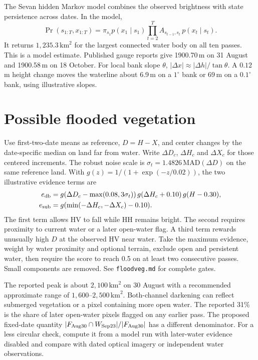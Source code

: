 \documentclass[11pt]{article}
\begin{document}
The Sevan hidden Markov model combines the observed brightness with
state persistence across dates. In the model,
\[
 \Pr(s_{1:T},x_{1:T})=\pi_{s_1}p(x_1\mid s_1)
 \prod_{t=2}^{T}A_{s_{t-1},s_t}\,p(x_t\mid s_t).
\]
It returns $1{,}235.3\,\mathrm{km}^2$ for the largest connected water
body on all ten passes. This is a model estimate. Published gauge
reports give 1900.70\,m on 31 August and 1900.58\,m on 18 October.
For local bank slope $\theta$, $|\Delta x|\approx|\Delta h|/\tan\theta$.
A $0.12$\,m height change moves the waterline about 6.9\,m on a
$1^\circ$ bank or 69\,m on a $0.1^\circ$ bank, using illustrative slopes.

\section{Possible flooded vegetation}
Use first-two-date means as reference, $D=H-X$, and center changes
by the date-specific median on land far from water. Write $\Delta D_c$,
$\Delta H_c$ and $\Delta X_c$ for those centered increments. The
robust noise scale is $\sigma_t=1.4826\,\mathrm{MAD}(\Delta D)$ on
the same reference land. With $g(z)=1/(1+\exp(-z/0.02))$, the two
illustrative evidence terms are
\begin{align*}
 e_{\rm db} &= g(\Delta D_c-\max(0.08,3\sigma_t))\,
              g(\Delta H_c+0.10)\,g(H-0.30),\\
 e_{\rm sub} &= g(\min(-\Delta H_c,-\Delta X_c)-0.10).
\end{align*}
The first term allows HV to fall while HH remains bright. The second
requires proximity to current water or a later open-water flag.
A third term rewards unusually high $D$ at the observed HV near water.
Take the maximum evidence, weight by water proximity and optional
terrain, exclude open and persistent water, then require the score
to reach 0.5 on at least two consecutive passes. Small components
are removed. See \texttt{floodveg.md} for complete gates.

The reported peak is about $2{,}100\,\mathrm{km}^2$ on 30 August
with a recommended approximate range of $1{,}600$--$2{,}500\,\mathrm{km}^2$.
Both-channel darkening can reflect submerged vegetation or a pixel
containing more open water. The reported 31\% is the share of later
open-water pixels flagged on any earlier pass. The proposed fixed-date
quantity $|F_{\rm Aug30}\cap W_{\rm Sep23}|/|F_{\rm Aug30}|$ has a
different denominator. For a less circular check, compute it from
a model run with later-water evidence disabled and compare with dated
optical imagery or independent water observations.
\end{document}
